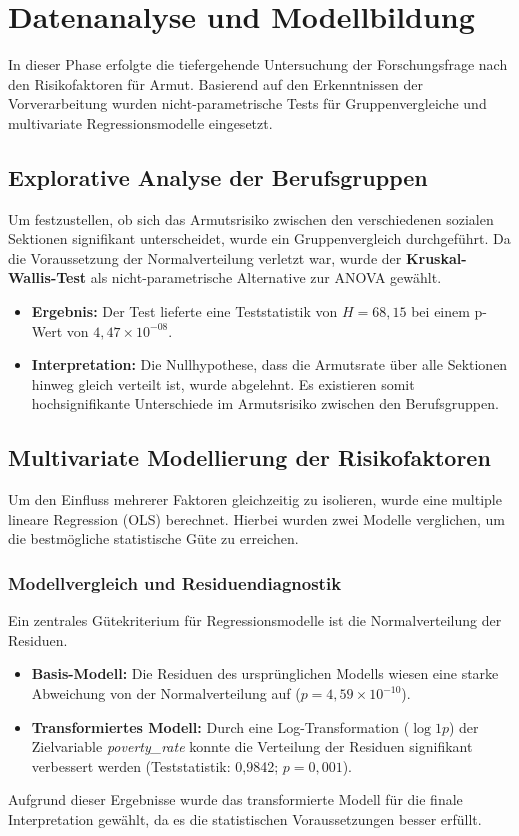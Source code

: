 \chapter{Datenanalyse und Modellbildung}
\label{chap:analyse}

In dieser Phase erfolgte die tiefergehende Untersuchung der Forschungsfrage nach den Risikofaktoren für Armut. Basierend auf den Erkenntnissen der Vorverarbeitung wurden nicht-parametrische Tests für Gruppenvergleiche und  multivariate Regressionsmodelle eingesetzt.

\section*{Explorative Analyse der Berufsgruppen}
Um festzustellen, ob sich das Armutsrisiko zwischen den verschiedenen sozialen Sektionen signifikant unterscheidet, wurde ein Gruppenvergleich durchgeführt. Da die Voraussetzung der Normalverteilung verletzt war, wurde der \textbf{Kruskal-Wallis-Test} als nicht-parametrische Alternative zur ANOVA gewählt.

\begin{itemize}
    \item \textbf{Ergebnis:} Der Test lieferte eine Teststatistik von $H = 68,15$ bei einem p-Wert von $4,47 \times 10^{-08}$.
    \item \textbf{Interpretation:} Die Nullhypothese, dass die Armutsrate über alle Sektionen hinweg gleich verteilt ist, wurde abgelehnt. Es existieren somit hochsignifikante Unterschiede im Armutsrisiko zwischen den Berufsgruppen.
\end{itemize}

\section*{Multivariate Modellierung der Risikofaktoren}
Um den Einfluss mehrerer Faktoren gleichzeitig zu isolieren, wurde eine multiple lineare Regression (OLS) berechnet. Hierbei wurden zwei Modelle verglichen, um die bestmögliche statistische Güte zu erreichen.

\subsection*{Modellvergleich und Residuendiagnostik}
Ein zentrales Gütekriterium für Regressionsmodelle ist die Normalverteilung der Residuen.
\begin{itemize}
    \item \textbf{Basis-Modell:} Die Residuen des ursprünglichen Modells wiesen eine starke Abweichung von der Normalverteilung auf ($p = 4,59 \times 10^{-10}$).
    \item \textbf{Transformiertes Modell:} Durch eine Log-Transformation ($\log1p$) der Zielvariable \textit{poverty\_rate} konnte die Verteilung der Residuen signifikant verbessert werden (Teststatistik: 0,9842; $p = 0,001$).
\end{itemize}
Aufgrund dieser Ergebnisse wurde das transformierte Modell für die finale Interpretation gewählt, da es die statistischen Voraussetzungen besser erfüllt.

